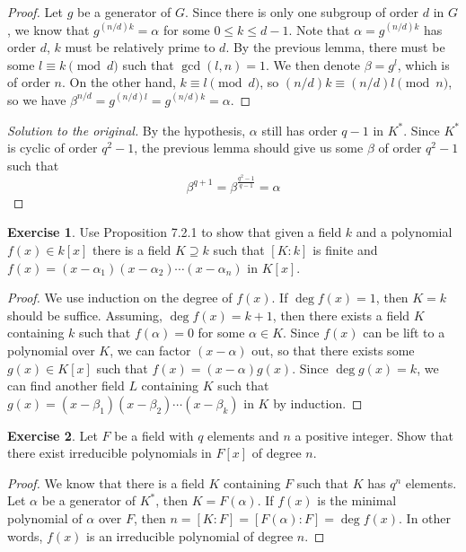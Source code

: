 \documentclass{article}
\theoremstyle{definition}
\newtheorem{exercise}{Exercise}
\begin{document}
\begin{proof}
Let $g$ be a generator of $G$. Since there is only one subgroup of order $d$ in $G$, we know that $g^{(n/d) k} = \alpha$ for some $0 \leq k \leq d - 1$. Note that $\alpha = g^{(n/d) k}$ has order $d$, $k$ must be relatively prime to $d$. By the previous lemma, there must be some $l \equiv k \pmod{d}$ such that $\gcd(l, n) = 1$. We then denote $\beta = g^l$, which is of order $n$. On the other hand, $k \equiv l \pmod{d}$, so $(n/d) k \equiv (n/d) l \pmod{n}$, so we have $\beta^{n/d} = g^{(n/d)l} = g^{(n/d)k} = \alpha$.
\end{proof}
\begin{proof}[Solution to the original]
By the hypothesis, $\alpha$ still has order $q - 1$ in $K^*$. Since $K^*$ is cyclic of order $q^2 - 1$, the previous lemma should give us some $\beta$ of order $q^2 - 1$ such that
$$\beta^{q + 1} = \beta^{\frac{q^2 - 1}{q - 1}} = \alpha$$
\end{proof}

\newpage
 
\begin{exercise} \label{c7-ex-12}
Use Proposition 7.2.1 to show that given a field $k$ and a polynomial $f(x) \in k[x]$ there is a field $K \supseteq k$ such that $[K : k]$ is finite and $f(x) = (x - \alpha_1) (x - \alpha_2) \cdots (x - \alpha_n)$ in $K[x]$.
\end{exercise}
\begin{proof}
We use induction on the degree of $f(x)$. If $\deg f(x) = 1$, then $K = k$ should be suffice. Assuming, $\deg f(x) = k + 1$, then there exists a field $K$ containing $k$ such that $f(\alpha) = 0$ for some $\alpha \in K$. Since $f(x)$ can be lift to a polynomial over $K$, we can factor $(x - \alpha)$ out, so that there exists some $g(x) \in K[x]$ such that $f(x) = (x - \alpha) g(x)$. Since $\deg g(x) = k$, we can find another field $L$ containing $K$ such that $g(x) = (x - \beta_1) (x - \beta_2) \cdots (x - \beta_k)$ in $K$ by induction.
\end{proof}

\newpage

\setcounter{exercise}{13}
\begin{exercise}
Let $F$ be a field with $q$ elements and $n$ a positive integer. Show that there exist irreducible polynomials in $F[x]$ of degree $n$.
\end{exercise}
\begin{proof}
We know that there is a field $K$ containing $F$ such that $K$ has $q^n$ elements. Let $\alpha$ be a generator of $K^*$, then $K = F(\alpha)$. If $f(x)$ is the minimal polynomial of $\alpha$ over $F$, then $n = [K : F] = [F(\alpha) : F] = \deg f(x)$. In other words, $f(x)$ is an irreducible polynomial of degree $n$.
\end{proof}
\end{document}

